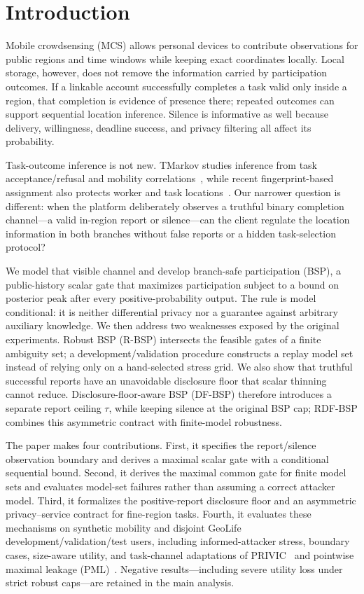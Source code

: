 \documentclass[review,11pt,times]{elsarticle}
\begin{document}
\section{Introduction}
Mobile crowdsensing (MCS) allows personal devices to contribute observations for public regions and time windows while keeping exact coordinates locally. Local storage, however, does not remove the information carried by participation outcomes. If a linkable account successfully completes a task valid only inside a region, that completion is evidence of presence there; repeated outcomes can support sequential location inference. Silence is informative as well because delivery, willingness, deadline success, and privacy filtering all affect its probability.

Task-outcome inference is not new. TMarkov studies inference from task acceptance/refusal and mobility correlations~\cite{tmarkov}, while recent fingerprint-based assignment also protects worker and task locations~\cite{fingerprint}. Our narrower question is different: when the platform deliberately observes a truthful binary completion channel---a valid in-region report or silence---can the client regulate the location information in both branches without false reports or a hidden task-selection protocol?

We model that visible channel and develop branch-safe participation (BSP), a public-history scalar gate that maximizes participation subject to a bound on posterior peak after every positive-probability output. The rule is model conditional: it is neither differential privacy nor a guarantee against arbitrary auxiliary knowledge. We then address two weaknesses exposed by the original experiments. Robust BSP (R-BSP) intersects the feasible gates of a finite ambiguity set; a development/validation procedure constructs a replay model set instead of relying only on a hand-selected stress grid. We also show that truthful successful reports have an unavoidable disclosure floor that scalar thinning cannot reduce. Disclosure-floor-aware BSP (DF-BSP) therefore introduces a separate report ceiling \(\tau\), while keeping silence at the original BSP cap; RDF-BSP combines this asymmetric contract with finite-model robustness.

The paper makes four contributions. First, it specifies the report/silence observation boundary and derives a maximal scalar gate with a conditional sequential bound. Second, it derives the maximal common gate for finite model sets and evaluates model-set failures rather than assuming a correct attacker model. Third, it formalizes the positive-report disclosure floor and an asymmetric privacy--service contract for fine-region tasks. Fourth, it evaluates these mechanisms on synthetic mobility and disjoint GeoLife development/validation/test users, including informed-attacker stress, boundary cases, size-aware utility, and task-channel adaptations of PRIVIC~\cite{privic2024} and pointwise maximal leakage (PML)~\cite{pml2024}. Negative results---including severe utility loss under strict robust caps---are retained in the main analysis.
\end{document}
